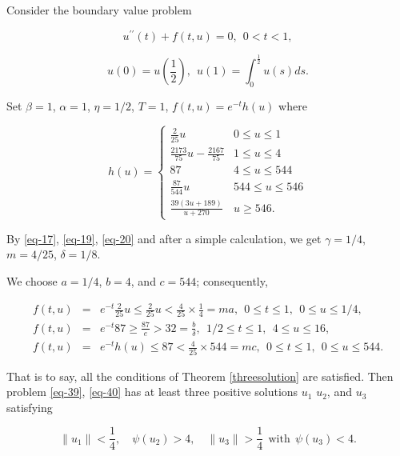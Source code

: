 \documentclass[reqno]{amsart}\usepackage{amsmath}
\begin{document}
\begin{example}
Consider the boundary value problem

\begin{equation}\label{eq-39}
{u^{\prime \prime }}(t)+f(t, u)=0, \  \ 0<t<1,
\end{equation}

\begin{equation}\label{eq-40}
u(0)=u(\frac{1}{2}), \  \ u(1)= \int_{0}^{\frac{1}{2}}u(s)ds.
\end{equation}

Set $\beta=1$, $\alpha=1$, $\eta=1/2$, $T=1$, $f(t, u)=e^{-t}h(u)$ where

 \begin{equation}\label{green}
h(u) = \begin{cases} \frac{2}{25}u  &  0\leq u\leq 1  \\
\frac{2173}{75}u-\frac{2167}{75} &  1\leq u\leq 4 \\
 87   &   4\leq u\leq 544 \\
\frac{87}{544}u   &  544\leq u\leq 546 \\
\frac{39(3u+189)}{u+270} &  u\geq 546.
\end{cases}
\end{equation}

By \eqref{eq-17}, \eqref{eq-19}, \eqref{eq-20} and after a simple calculation, we get $\gamma=1/4$, $m=4/25$, $\delta=1/8$.

We choose $a = 1/4$, $b = 4$, and $c = 544$; consequently,

\begin{eqnarray*}
f(t, u)&=&e^{-t}\frac{2}{25}u\leq \frac{2}{25}u<\frac{4}{25}\times\frac{1}{4}=ma, \ \  0\leq t\leq 1, \ \ 0\leq u\leq 1/4,\\
f(t, u)&=&e^{-t}87\geq \frac{87}{e}>32=\frac{b}{\delta}, \ \  1/2\leq t\leq 1, \ \ 4\leq u\leq 16,\\
f(t, u)&=&e^{-t}h(u)\leq 87<\frac{4}{25}\times544=mc, \ \  0\leq t\leq 1, \ \ 0\leq u\leq 544.
\end{eqnarray*}


That is to say, all the conditions of Theorem \ref{threesolution} are satisfied. Then problem
\eqref{eq-39}, \eqref{eq-40} has at least three positive solutions $u_{1}$ $u_{2}$, and $u_{3}$ satisfying


$$
\|u_1\|<\frac{1}{4},\quad\psi(u_2)>4,\quad \|u_3\|>\frac{1}{4} \ \ \text{with}\ \ \psi(u_3)<4.
$$

\end{example}
\end{document}
